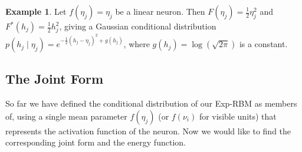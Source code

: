 \documentclass[twoside]{article}
\theoremstyle{plain}
\theoremstyle{definition}
\newtheorem{example}{Example}[section]
\theoremstyle{remark}
\newcommand{\eg}[0]{\emph{e.g.},~}
\newcommand{\refEq}[1]{\cref{#1}}%
\newcommand{\sfit}[1]{\ensuremath{#1}}
\newcommand{\y}[0]{\ensuremath{{h}}}%
\newcommand{\pp}[0]{\ensuremath{\sfit{p}}}%
\newcommand{\ff}[0]{\ensuremath{\sfit{f}}}%
\newcommand{\FF}[0]{\ensuremath{\sfit{F}}}%
\newcommand{\hh}[0]{\ensuremath{\sfit{r}}}%
\newcommand{\gh}[0]{\ensuremath{\sfit{g}}}%
\newcommand{\dd}[0]{\ensuremath{\mathrm{d}}}%
\begin{document}
\begin{mdframed}[style=MyFrame]
\begin{example}\label{ex:gaussian}
  Let $\ff(\eta_j) = \eta_j$ be a linear neuron. Then $\FF(\eta_j) = \frac{1}{2} \eta_j^2$ and 
  $\FF^*(\y_j) = \frac{1}{2} \y_j^2$, giving a Gaussian conditional distribution
  $\pp(\y_j \mid \eta_j) = e^{- \frac{1}{2}( \y_j - \eta_j)^2  + \gh(\y_j) } $, where 
  $\gh(\y_j) = \log(\sqrt{2\pi})$ is a constant. 
\end{example}
\end{mdframed}



\subsection{The Joint Form}
So far we have defined the conditional distribution of our Exp-RBM as members of, 
using a single mean parameter $\ff(\eta_j)$ (or $\ff(\nu_i)$ for visible units) that represents the activation function of the neuron. Now we would like to find the corresponding joint form and the energy function.
\end{document}
